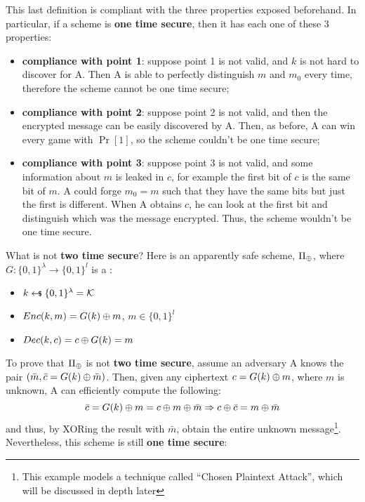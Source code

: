 This last definition is compliant with the three properties exposed beforehand. In particular, if a scheme is \textbf{one time secure}, then it has each one of these 3 properties:


\begin{itemize}
    \item \textbf{compliance with point 1}: suppose point 1 is not valid, and $k$ is not hard to discover for \textsf{A}. Then \textsf{A} is able to perfectly distinguish $m$ and $m_{0}$ every time, therefore the scheme cannot be one time secure;
    \item \textbf{compliance with point 2}: suppose point 2 is not valid, and then the encrypted message can be easily discovered by \textsf{A}. Then, as before, \textsf{A} can win every game with $\Pr[1]$, so the scheme couldn't be one time secure;
    \item \textbf{compliance with point 3}: suppose point 3 is not valid, and some information about $m$ is leaked in $c$, for example the first bit of $c$ is the same bit of $m$. \textsf{A} could forge $m_0 = m$ such that they have the same bits but just the first is different. When \textsf{A} obtains $c$, he can look at the first bit and distinguish which was the message encrypted. Thus, the scheme wouldn't be one time secure.
\end{itemize}

What is not \textbf{two time secure}? Here is an apparently safe scheme, $\Pi_{\oplus}$, where $G : \{0, 1\}^\lambda \to \{0, 1\}^l$ is a \prg:

\begin{itemize}
    \item $k \pickUAR \{0, 1\}^{\lambda} = \K$
    \item $Enc(k, m) = G(k) \oplus m$, $m \in \{0, 1\}^{l}$
    \item $Dec(k, c) = c \oplus G(k) = m$
\end{itemize}

To prove that $\Pi_{\oplus}$ is not \textbf{two time secure}, assume an adversary \textsf{A} knows the pair $(\bar{m}, \bar{c} = G(k) \oplus \bar{m})$. Then, given any ciphertext $c = G(k) \oplus m$, where $m$ is unknown, \textsf{A} can efficiently compute the following: 
\[
    \bar{c} = G(k) \oplus m = c \oplus m \oplus \bar{m} \Rightarrow c \oplus \bar{c} = m \oplus \bar{m} 
\]
and thus, by XORing the result with $\bar{m}$, obtain the entire unknown message\footnote{This example models a technique called ``Chosen Plaintext Attack'', which will be discussed in depth later}. Nevertheless, this scheme is still \textbf{one time secure}:

